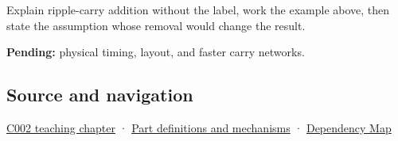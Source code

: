Explain ripple-carry addition without the label, work the example above, then state the assumption whose removal would change the result.

\textbf{Pending:} physical timing, layout, and faster carry networks.

\subsection{Source and navigation}\label{appendix-17917d9fdbe3-source-and-navigation}

\hyperref[01-foundations-i-ch001-arithmetic-becomes-a-policy]{C002 teaching chapter} · \hyperref[appendix-fd090d982a15]{Part definitions and mechanisms} · \hyperref[appendix-4ad47bdd269a]{Dependency Map}
